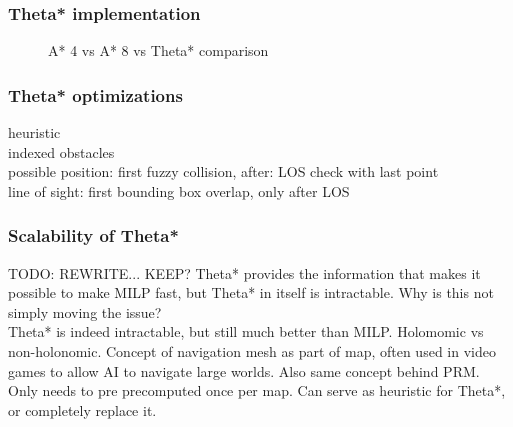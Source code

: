 %
%
%
%
\subsubsection{Theta* implementation}
\begin{figure}
A* 4 vs A* 8 vs Theta* comparison
\label{figure:thetastarcompare}
\end{figure}

\subsubsection{Theta* optimizations}
heuristic \\
indexed obstacles \\
possible position: first fuzzy collision, after: LOS check with last point \\
line of sight: first bounding box overlap, only after LOS \\

\subsubsection{Scalability of Theta*}
TODO: REWRITE... KEEP?
Theta* provides the information that makes it possible to make MILP fast, but Theta* in itself is intractable. Why is this not simply moving the issue?\\
Theta* is indeed intractable, but still much better than MILP. Holomomic vs non-holonomic. Concept of navigation mesh as part of map, often used in video games to allow AI to navigate large worlds. Also same concept behind PRM. Only needs to pre precomputed once per map. Can serve as heuristic for Theta*, or completely replace it.


